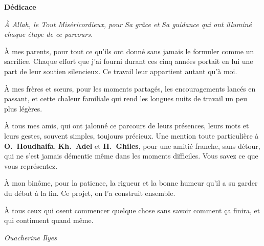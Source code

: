 \newpage
\begin{titlepage}
\thispagestyle{empty}
\centering

\textbf{\Huge{\textcolor{bleu}{Dédicace}}}\\[2em]

\begin{center}
\itshape
À Allah, le Tout Miséricordieux, pour Sa grâce et Sa guidance qui ont illuminé chaque étape de ce parcours.

\bigskip

À mes parents, pour tout ce qu'ils ont donné sans jamais le formuler comme un sacrifice. Chaque effort que j'ai fourni durant ces cinq années portait en lui une part de leur soutien silencieux. Ce travail leur appartient autant qu'à moi.

\bigskip

À mes frères et s\oe{}urs, pour les moments partagés, les encouragements lancés en passant, et cette chaleur familiale qui rend les longues nuits de travail un peu plus légères.

\bigskip

À tous mes amis, qui ont jalonné ce parcours de leurs présences, leurs mots et leurs gestes, souvent simples, toujours précieux. Une mention toute particulière à \textbf{O.~Houdhaifa}, \textbf{Kh.~Adel} et \textbf{H.~Ghiles}, pour une amitié franche, sans détour, qui ne s'est jamais démentie même dans les moments difficiles. Vous savez ce que vous représentez.

\bigskip

À mon bin\^{o}me, pour la patience, la rigueur et la bonne humeur qu'il a su garder du début à la fin. Ce projet, on l'a construit ensemble.

\bigskip

À tous ceux qui osent commencer quelque chose sans savoir comment ça finira, et qui continuent quand même.
\end{center}

\vfill
\raggedleft\textit{Ouacherine Ilyes}

\end{titlepage}
